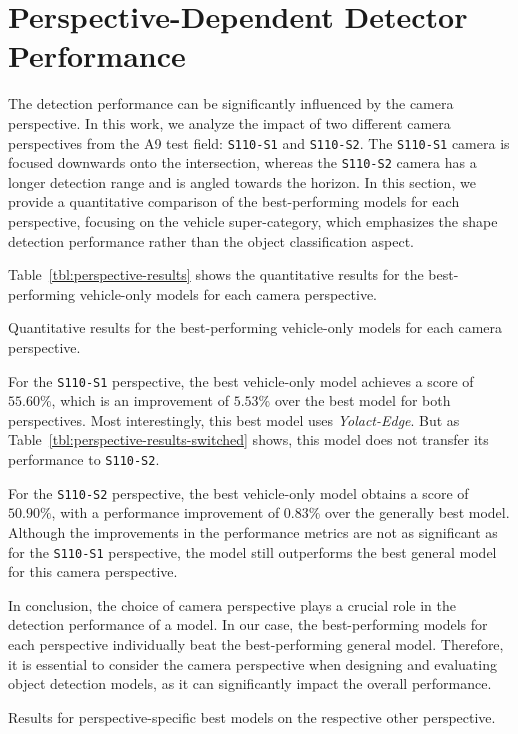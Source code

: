 \section{Perspective-Dependent Detector Performance}
\label{sec:perspective}

The detection performance can be significantly influenced by the camera perspective.
In this work, we analyze the impact of two different camera perspectives from the A9 test field: \texttt{S110-S1} and \texttt{S110-S2}.
The \texttt{S110-S1} camera is focused downwards onto the intersection, whereas the \texttt{S110-S2} camera has a longer detection range and is angled towards the horizon.
In this section, we provide a quantitative comparison of the best-performing models for each perspective, focusing on the vehicle super-category, which emphasizes the shape detection performance rather than the object classification aspect.

Table~\ref{tbl:perspective-results} shows the quantitative results for the best-performing vehicle-only models for each camera perspective.

\begin{table}[htb]
    
    \caption{Quantitative results for the best-performing vehicle-only models for each camera perspective.}
    \label{tbl:perspective-results}
\end{table}

For the \texttt{S110-S1} perspective, the best vehicle-only model achieves a score of $55.60\%$, which is an improvement of $5.53\%$ over the best model for both perspectives.
Most interestingly, this best model uses \textit{Yolact-Edge}.
But as Table~\ref{tbl:perspective-results-switched} shows, this model does not transfer its performance to \texttt{S110-S2}.

For the \texttt{S110-S2} perspective, the best vehicle-only model obtains a score of $50.90\%$, with a performance improvement of $0.83\%$ over the generally best model.
Although the improvements in the performance metrics are not as significant as for the \texttt{S110-S1} perspective, the model still outperforms the best general model for this camera perspective.

In conclusion, the choice of camera perspective plays a crucial role in the detection performance of a model.
In our case, the best-performing models for each perspective individually beat the best-performing general model.
Therefore, it is essential to consider the camera perspective when designing and evaluating object detection models, as it can significantly impact the overall performance.

\begin{table}[htb]
    
    \caption{Results for perspective-specific best models on the respective other perspective.}
    \label{tbl:perspective-results-switched}
\end{table}
